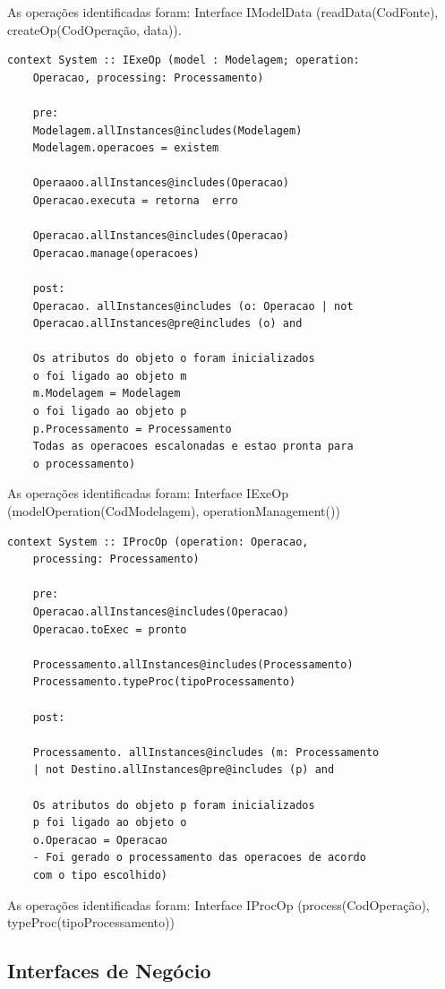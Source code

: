 As operações identificadas foram: Interface IModelData (readData(CodFonte), createOp(CodOperação, data)).

\begin{lstlisting}[frame=single, language=Oberon-2]
	context System :: IExeOp (model : Modelagem; operation: 
	Operacao, processing: Processamento)
	
	pre:
	Modelagem.allInstances@includes(Modelagem) 
	Modelagem.operacoes = existem 
	
	Operaaoo.allInstances@includes(Operacao) 
	Operacao.executa = retorna  erro
	
	Operacao.allInstances@includes(Operacao) 
	Operacao.manage(operacoes)
	
	post:
	Operacao. allInstances@includes (o: Operacao | not 
	Operacao.allInstances@pre@includes (o) and
	
	Os atributos do objeto o foram inicializados
	o foi ligado ao objeto m
	m.Modelagem = Modelagem
	o foi ligado ao objeto p
	p.Processamento = Processamento
	Todas as operacoes escalonadas e estao pronta para 
	o processamento)

\end{lstlisting}

As operações identificadas foram: Interface IExeOp (modelOperation(CodModelagem), operationManagement())

\begin{lstlisting}[frame=single, language=Oberon-2]
	context System :: IProcOp (operation: Operacao, 
	processing: Processamento)
	
	pre:
	Operacao.allInstances@includes(Operacao) 
	Operacao.toExec = pronto
	
	Processamento.allInstances@includes(Processamento) 
	Processamento.typeProc(tipoProcessamento)
	
	post:
		
	Processamento. allInstances@includes (m: Processamento 
	| not Destino.allInstances@pre@includes (p) and
	
	Os atributos do objeto p foram inicializados
	p foi ligado ao objeto o
	o.Operacao = Operacao
	- Foi gerado o processamento das operacoes de acordo 
	com o tipo escolhido)

\end{lstlisting}

As operações identificadas foram: Interface IProcOp (process(CodOperação), typeProc(tipoProcessamento))

\subsection{Interfaces de Negócio}

